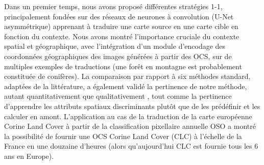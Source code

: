 Dans un premier temps, nous avons proposé différentes stratégies 1-1, principalement fondées sur des réseaux de neurones à convolution (U-Net asymmétrique) apprenant à traduire une carte source en une carte cible en fonction du contexte. Nous avons montré l'importance cruciale du contexte spatial et géographique, avec l'intégration d'un module d'encodage des coordonnées géographiques des images générées à partir des OCS, sur de multiples exemples de traductions (une forêt en montagne est probablement constituée de conifères). La comparaison par rapport à six méthodes standard, adaptées de la littérature, a également validé la pertinence de notre méthode, autant quantitativement que qualitativement \cite{Luc_RS}, tout comme la pertinence d'apprendre les attributs spatiaux discriminants plutôt que de les prédéfinir et les calculer en amont. L'application au cas de la traduction de la carte européenne Corine Land Cover à partir de la classification pixellaire annuelle OSO a montré la possibilité de fournir une OCS Corine Land Cover (CLC) à l'échelle de la France en une douzaine d'heures (alors qu'aujourd'hui CLC est fournie tous les 6 ans en Europe). \\

